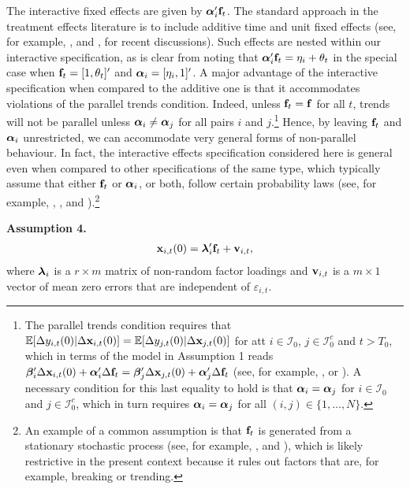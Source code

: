 \documentclass[12pt,fleqn]{article}
\begin{document}
  The interactive fixed effects are given by $\boldsymbol{\alpha}_i'\mathbf{f}_t$. The standard approach in the treatment effects literature is to include additive time and unit fixed effects (see, for example, \citealp{Caetano_Callaway_Payne_Rodrigues_2022}, and \citealp{Callaway_Karami_2020}, for recent discussions). Such effects are nested within our interactive specification, as is clear from noting that $\boldsymbol{\alpha}_i'\mathbf{f}_t = \eta_i + \theta_t$ in the special case when $\mathbf{f}_t = [1, \theta_t]'$ and $\boldsymbol{\alpha}_i = [\eta_i, 1]'$. A major advantage of the interactive specification when compared to the additive one is that it accommodates violations of the parallel trends condition. Indeed, unless $\mathbf{f}_t = \mathbf{f}$ for all $t$, trends will not be parallel unless $\boldsymbol{\alpha}_i \ne \boldsymbol{\alpha}_j$ for all pairs $i$ and $j$.\footnote{The parallel trends condition requires that $\mathbb{E}[\Delta y_{i,t}(0)|\Delta \mathbf{x}_{i,t}(0) ] = \mathbb{E}[\Delta y_{j,t}(0)|\Delta\mathbf{x}_{j,t}(0) ]$ for att $i \in \mathcal{I}_0$, $j \in \mathcal{I}_0^c$ and $t > T_0$, which in terms of the model in Assumption 1 reads $\boldsymbol{\beta}_i'\Delta\mathbf{x}_{i,t}(0) + \boldsymbol{\alpha}_i'\Delta\mathbf{f}_t = \boldsymbol{\beta}_j'\Delta\mathbf{x}_{j,t}(0) + \boldsymbol{\alpha}_j'\Delta\mathbf{f}_t$ (see, for example, \citealp{Callaway_SantAnna_2020}, or \citealp{chan2022pcdid}). A necessary condition for this last equality to hold is that $\boldsymbol{\alpha}_i = \boldsymbol{\alpha}_j$ for $i \in \mathcal{I}_0$ and $j \in \mathcal{I}_0^c$, which in turn requires $\boldsymbol{\alpha}_i = \boldsymbol{\alpha}_j$ for all $(i,j)\in \{1,...,N\}$.} Hence, by leaving $\mathbf{f}_t$ and $\boldsymbol{\alpha}_i$ unrestricted, we can accommodate very general forms of non-parallel behaviour. In fact, the interactive effects specification considered here is general even when compared to other specifications of the same type, which typically assume that either $\mathbf{f}_t$ or $\boldsymbol{\alpha}_i$, or both, follow certain probability laws (see, for example, \citealp{chan2022pcdid}, \citealp{Gobillon_Magnac_2016}, and \citealp{Xu_2017}).\footnote{An example of a common assumption is that $\mathbf{f}_t$ is generated from a stationary stochastic process (see, for example, \citealp{Gobillon_Magnac_2016}, and \citealp{Xu_2017}), which is likely restrictive in the present context because it rules out factors that are, for example, breaking or trending.}
  
  \bigskip
  
  \noindent \textbf{Assumption 4.}
  \begin{align*}
  \mathbf{x}_{i,t}(0) = \boldsymbol{\lambda}_i'\mathbf{f}_t + \mathbf{v}_{i,t},
  \end{align*}
  where $\boldsymbol{\lambda}_i$ is a $r \times m$ matrix of non-random factor loadings and $\mathbf{v}_{i,t}$ is a $m \times 1$ vector of mean zero errors that are independent of $\varepsilon_{i,t}$.
  
\end{document}
